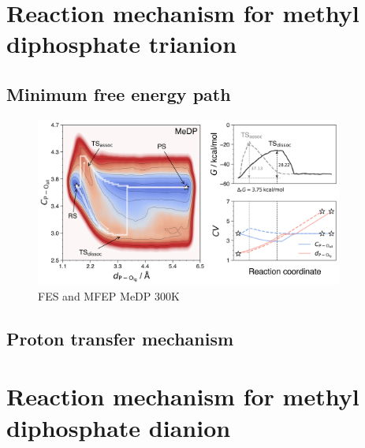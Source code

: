 \clearpage
\section{Reaction mechanism for methyl diphosphate trianion}





\subsection{Minimum free energy path}

\begin{figure}[ht]
    \centering
    \includegraphics[width=0.9\textwidth]{Figures/4_Results/results_MeDP_300K_fes_mfep.png}
    \caption{FES and MFEP MeDP 300K}
    \label{fig:medp_300k_fes_mfep}
\end{figure}


\subsection{Proton transfer mechanism}



\clearpage
\section{Reaction mechanism for methyl diphosphate dianion}



